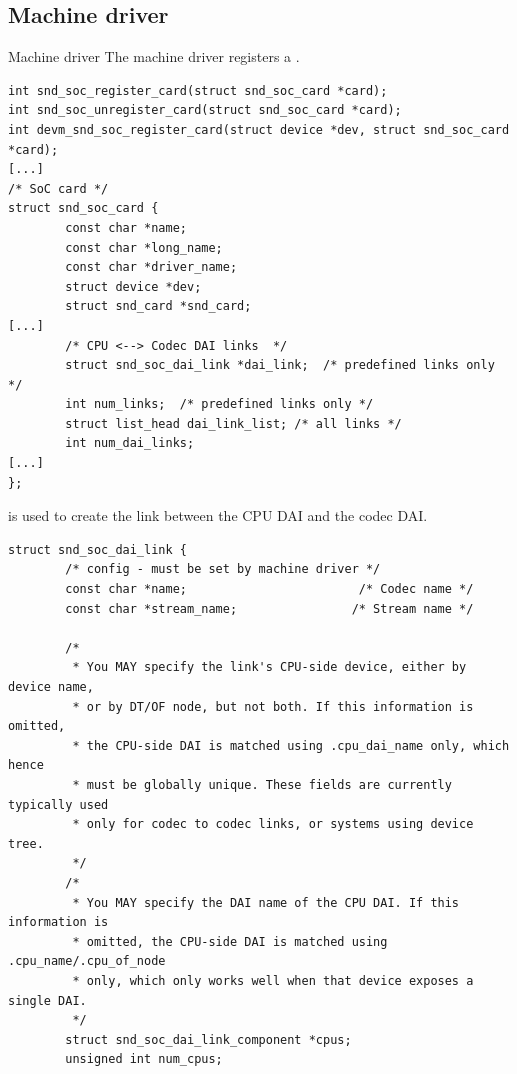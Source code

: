 \subsection{Machine driver}

\begin{frame}[fragile]{Machine driver}
The machine driver registers a .
      \begin{block}{}
        \fontsize{8}{8}\selectfont
        \begin{verbatim}
int snd_soc_register_card(struct snd_soc_card *card);
int snd_soc_unregister_card(struct snd_soc_card *card);
int devm_snd_soc_register_card(struct device *dev, struct snd_soc_card *card);
[...]
/* SoC card */
struct snd_soc_card {
        const char *name;
        const char *long_name;
        const char *driver_name;
        struct device *dev;
        struct snd_card *snd_card;
[...]
        /* CPU <--> Codec DAI links  */
        struct snd_soc_dai_link *dai_link;  /* predefined links only */
        int num_links;  /* predefined links only */
        struct list_head dai_link_list; /* all links */
        int num_dai_links;
[...]
};
        \end{verbatim}
      \end{block}
\end{frame}

\begin{frame}[fragile]{}
 is used to create the link between the
  CPU DAI and the codec DAI.
  \begin{block}{}
    \fontsize{8}{8}\selectfont
    \begin{verbatim}
struct snd_soc_dai_link {
        /* config - must be set by machine driver */
        const char *name;                        /* Codec name */
        const char *stream_name;                /* Stream name */

        /*
         * You MAY specify the link's CPU-side device, either by device name,
         * or by DT/OF node, but not both. If this information is omitted,
         * the CPU-side DAI is matched using .cpu_dai_name only, which hence
         * must be globally unique. These fields are currently typically used
         * only for codec to codec links, or systems using device tree.
         */
        /*
         * You MAY specify the DAI name of the CPU DAI. If this information is
         * omitted, the CPU-side DAI is matched using .cpu_name/.cpu_of_node
         * only, which only works well when that device exposes a single DAI.
         */
        struct snd_soc_dai_link_component *cpus;
        unsigned int num_cpus;
     \end{verbatim}
   \end{block}
\end{frame}

